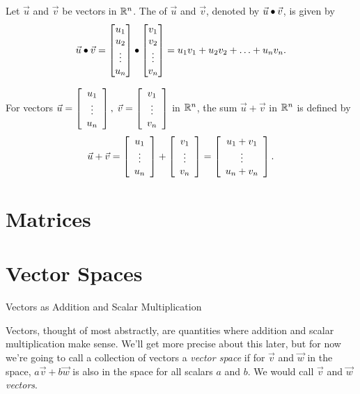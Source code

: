 \documentclass{ximera}
\begin{document}
\begin{definition}\label{def:dotproduct}
    Let $\vec{u}$ and $\vec{v}$ be vectors in $\RR^n$.  The  of $\vec{u}$ and $\vec{v}$, denoted by
    $\vec{u}\dotp \vec{v}$, is given by
    \begin{align*}
      \vec{u}\dotp\vec{v}=\begin{bmatrix}u_1\\u_2\\\vdots\\u_n\end{bmatrix}\dotp\begin{bmatrix}v_1\\v_2\\\vdots\\v_n\end{bmatrix}=u_1v_1+u_2v_2+\ldots+u_nv_n.
    \end{align*}
\end{definition}


\begin{definition}\label{def:vecadd}
    For vectors $\vec{u}=\startmat{c}
      u_1 \\
      \vdots \\
      u_n
    \stopmat,\; \vec{v}= \startmat{c}
      v_1 \\
      \vdots \\
      v_n
    \stopmat$ in $\R^n$, the sum $\vec{u}+\vec{v}$ in $\R^n$ is defined
    by
    \begin{equation*}
      \vec{u}+\vec{v} = \startmat{c}
        u_1 \\
        \vdots \\
        u_n
      \stopmat +  \startmat{c}
        v_1 \\
        \vdots \\
        v_n
      \stopmat
      = \startmat{c}
        u_1+v_1 \\
        \vdots \\
        u_n+v_n
      \stopmat.
    \end{equation*}
  \end{definition}

\section{Matrices}

\section{Vector Spaces}

\begin{definition}{Vectors as Addition and Scalar Multiplication}%

    Vectors, thought of most abstractly, are quantities where addition and scalar multiplication make sense. We'll get more precise about this later, but for now we're going to call a collection of vectors a \textit{vector space} if for $\vec{v}$ and $\vec{w}$ in the space, $a\vec{v}+b\vec{w}$ is also in the space for all scalars $a$ and $b$. We would call $\vec{v}$ and $\vec{w}$ \textit{vectors}.

\end{definition}
\end{document}
